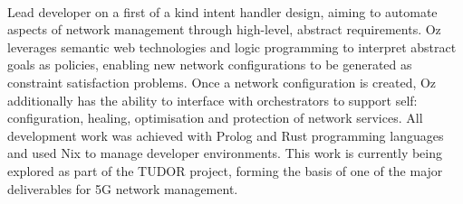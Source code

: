 \documentclass[9pt]{developercv} %
\begin{document}
\begin{minipage}[t]{0.6\textwidth}
	\vspace{-\baselineskip} %
	\\
	Lead developer on a first of a kind intent handler design, aiming to
	automate aspects of network management through high-level, abstract
	requirements. Oz leverages semantic web technologies and logic programming
	to interpret abstract goals as policies, enabling new network configurations
	to be generated as constraint satisfaction problems. Once a network
	configuration is created, Oz additionally has the ability to interface with
	orchestrators to support self: configuration, healing, optimisation and
	protection of network services. All development work was achieved with
	Prolog and Rust programming languages and used Nix to manage developer
	environments. This work is currently being explored as part of the TUDOR
	project, forming the basis of one of the major deliverables for 5G network
	management.
\end{minipage}

\end{document}

